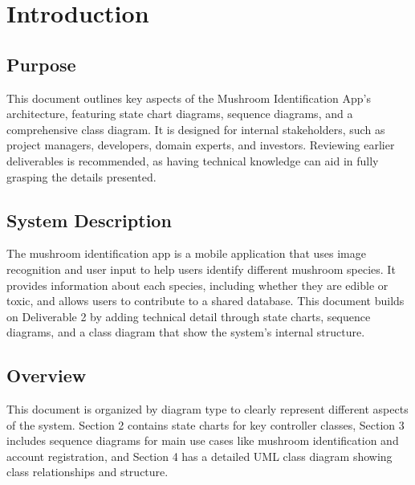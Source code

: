 \documentclass[]{article}
\begin{document}
\section{Introduction}
\label{sec:introduction}


\subsection{Purpose}
\label{sub:purpose}
This document outlines key aspects of the Mushroom Identification App's architecture, featuring state chart diagrams, sequence diagrams, and a comprehensive class diagram.
It is designed for internal stakeholders, such as project managers, developers, domain experts, and investors. Reviewing earlier deliverables is recommended, as having technical knowledge can aid in fully grasping the details presented.


\subsection{System Description}
\label{sub:system_description}
The mushroom identification app is a mobile application that uses image recognition and user input to help users identify different mushroom species. It provides information about each species, including whether they are edible or toxic, and allows users to contribute to a shared database. This document builds on Deliverable 2 by adding technical detail through state charts, sequence diagrams, and a class diagram that show the system’s internal structure.


\subsection{Overview}
\label{sub:overview}
This document is organized by diagram type to clearly represent different aspects of the system. Section 2 contains state charts for key controller classes, Section 3 includes sequence diagrams for main use cases like mushroom identification and account registration, and Section 4 has a detailed UML class diagram showing class relationships and structure.



\end{document}

